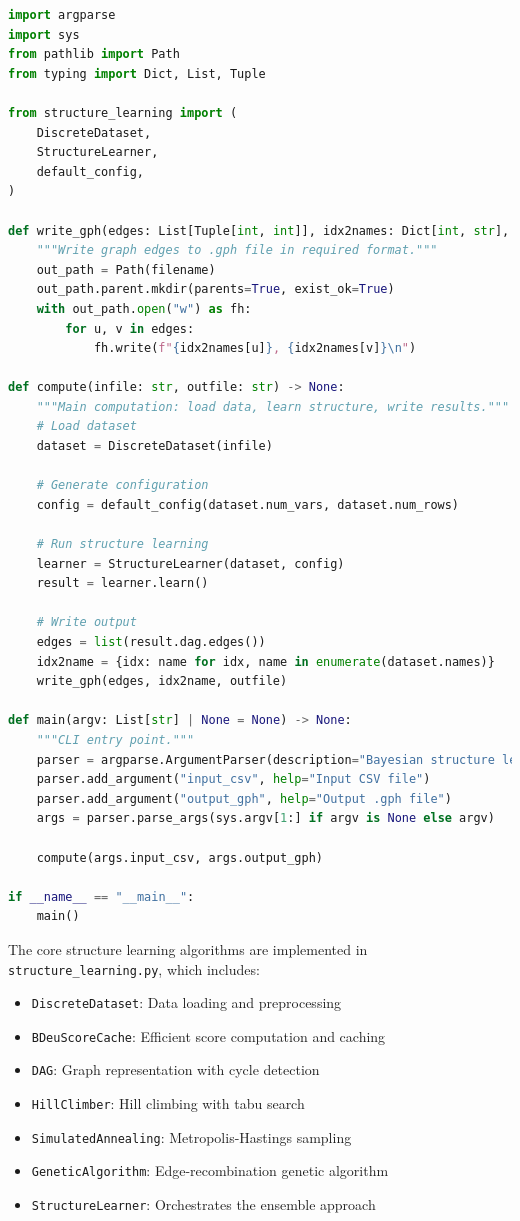 \documentclass[twoside,11pt]{article}
\begin{document}
\begin{algorithm}
\begin{lstlisting}[language=Python]
import argparse
import sys
from pathlib import Path
from typing import Dict, List, Tuple

from structure_learning import (
    DiscreteDataset,
    StructureLearner,
    default_config,
)

def write_gph(edges: List[Tuple[int, int]], idx2names: Dict[int, str], filename: str) -> None:
    """Write graph edges to .gph file in required format."""
    out_path = Path(filename)
    out_path.parent.mkdir(parents=True, exist_ok=True)
    with out_path.open("w") as fh:
        for u, v in edges:
            fh.write(f"{idx2names[u]}, {idx2names[v]}\n")

def compute(infile: str, outfile: str) -> None:
    """Main computation: load data, learn structure, write results."""
    # Load dataset
    dataset = DiscreteDataset(infile)
    
    # Generate configuration
    config = default_config(dataset.num_vars, dataset.num_rows)
    
    # Run structure learning
    learner = StructureLearner(dataset, config)
    result = learner.learn()
    
    # Write output
    edges = list(result.dag.edges())
    idx2name = {idx: name for idx, name in enumerate(dataset.names)}
    write_gph(edges, idx2name, outfile)

def main(argv: List[str] | None = None) -> None:
    """CLI entry point."""
    parser = argparse.ArgumentParser(description="Bayesian structure learning")
    parser.add_argument("input_csv", help="Input CSV file")
    parser.add_argument("output_gph", help="Output .gph file")
    args = parser.parse_args(sys.argv[1:] if argv is None else argv)
    
    compute(args.input_csv, args.output_gph)

if __name__ == "__main__":
    main()
\end{lstlisting}
\end{algorithm}

The core structure learning algorithms are implemented in \texttt{structure\_learning.py}, which includes:
\begin{itemize}
\item \texttt{DiscreteDataset}: Data loading and preprocessing
\item \texttt{BDeuScoreCache}: Efficient score computation and caching
\item \texttt{DAG}: Graph representation with cycle detection
\item \texttt{HillClimber}: Hill climbing with tabu search
\item \texttt{SimulatedAnnealing}: Metropolis-Hastings sampling
\item \texttt{GeneticAlgorithm}: Edge-recombination genetic algorithm
\item \texttt{StructureLearner}: Orchestrates the ensemble approach
\end{itemize}
\end{document}
